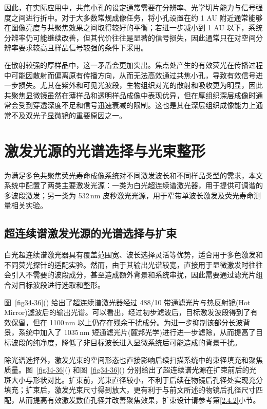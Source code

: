 因此，在实际应用中，共焦小孔的设定通常需要在分辨率、光学切片能力与信号强度之间进行折中。对于大多数常规成像任务，将小孔设置在约 1 AU 附近通常能够在图像亮度与共聚焦效果之间取得较好的平衡；若进一步减小到 1 AU 以下，系统分辨率仍可能继续改善，但其代价往往是显著的信号损失，因此通常只在对空间分辨率要求较高且样品信号较强的条件下采用。

在散射较强的厚样品中，这一矛盾会更加突出。焦点处产生的有效荧光在传播过程中可能因散射而偏离原有传播方向，从而无法高效通过共焦小孔，导致有效信号进一步损失。尤其在紫外和可见光波段，生物组织对光的散射和吸收更为明显，因此共聚焦显微镜虽然在薄样品和透明样品成像中表现优异，但在厚组织深层成像时通常会受到穿透深度不足和信号迅速衰减的限制。这也是其在深层组织成像能力上通常不及双光子显微镜的重要原因之一。




\section{激发光源的光谱选择与光束整形}\label{3.2}

为满足多色共聚焦荧光寿命成像系统对不同激发波长和不同样品类型的需求，本文系统中配置了两类主要激发光源：一类为白光超连续谱激光器，用于提供可调谐的多波段激发；另一类为 532\,nm 皮秒激光光源，用于窄带单波长激发及荧光寿命测量相关实验。

\subsection{超连续谱激发光源的光谱选择与扩束}\label{3.2.1}

白光超连续谱激光器具有覆盖范围宽、波长选择灵活等优势，适合用于多色激发和不同荧光探针的适配实验。然而，由于其输出光谱较宽，直接用于显微激发时往往会引入不需要的波段成分，甚至造成额外背景和系统串扰，因此需要通过滤光片组合对目标波段进行选取和整形。


图~\ref{fig34-36}() 给出了超连续谱激光器经过 488/10 带通滤光片与热反射镜(Hot Mirror)滤波后的输出光谱。可以看出，经过初步滤波后，目标激发波段得到了有效保留，但在 1100\,nm 以上仍存在残余干扰成分。为进一步抑制该部分长波背景，系统中加入了 1035\,nm 短通滤光片(麓邦光学)进行进一步滤除，从而提高了目标波段的纯净度，降低了非目标波长进入显微系统后可能造成的背景干扰。

除光谱选择外，激发光束的空间形态也直接影响后续扫描系统中的束径填充和聚焦质量。图~\ref{fig34-36}() 和图~\ref{fig34-36}() 分别给出了超连续谱光源在扩束前后的光斑大小与形状对比。扩束前，光束直径较小，不利于后续在物镜后孔径处实现充分填充；扩束后，激发光束尺寸得到放大，更有利于与前文所述的物镜后孔径尺寸匹配，从而提高有效激发数值孔径并改善聚焦效果，扩束设计请参考第\ref{2.4.2}小节。


